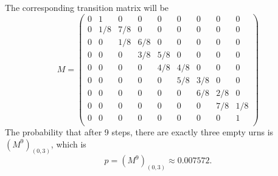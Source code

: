 \begin{solution}
\begin{center}
\end{center}
The corresponding transition matrix will be
\[
M = \begin{pmatrix}
	0 & 1 & 0 & 0 & 0 & 0 & 0 & 0 & 0 \\
	0 & 1/8 & 7/8 & 0 & 0 & 0 & 0 & 0 & 0 \\
	0 & 0 & 1/8 & 6/8 & 0 & 0 & 0 & 0 & 0 \\
	0 & 0 & 0 & 3/8 & 5/8 & 0 & 0 & 0 & 0 \\
	0 & 0 & 0 & 0 & 4/8 & 4/8 & 0 & 0 & 0 \\
	0 & 0 & 0 & 0 & 0 & 5/8 & 3/8 & 0 & 0 \\
	0 & 0 & 0 & 0 & 0 & 0 & 6/8 & 2/8 & 0 \\
	0 & 0 & 0 & 0 & 0 & 0 & 0 & 7/8 & 1/8 \\
	0 & 0 & 0 & 0 & 0 & 0 & 0 & 0 & 1 \\
\end{pmatrix}
\]
The probability that after 9 steps, there are exactly three empty urns is $(M^9)_{(0,3)}$, which is
\[ p = (M^9)_{(0,3)} \approx 0.007572. \]
\end{solution}

